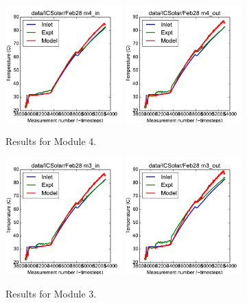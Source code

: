 \documentclass{article}
\begin{document}
\clearpage
\begin{figure}[!ht]
\centering
\includegraphics[width=0.4\textwidth]{../../data/ICSolar/images/Feb28_m4_in_unsteady.pdf}\hspace{0.05\textwidth}
\includegraphics[width=0.4\textwidth]{../../data/ICSolar/images/Feb28_m4_out_unsteady.pdf}\hspace{0.05\textwidth}\\
\caption{Results for Module 4.}\end{figure}
\begin{figure}[!ht]
\centering
\includegraphics[width=0.4\textwidth]{../../data/ICSolar/images/Feb28_m3_in_unsteady.pdf}\hspace{0.05\textwidth}
\includegraphics[width=0.4\textwidth]{../../data/ICSolar/images/Feb28_m3_out_unsteady.pdf}\hspace{0.05\textwidth}\\
\caption{Results for Module 3.}\end{figure}
\end{document}
